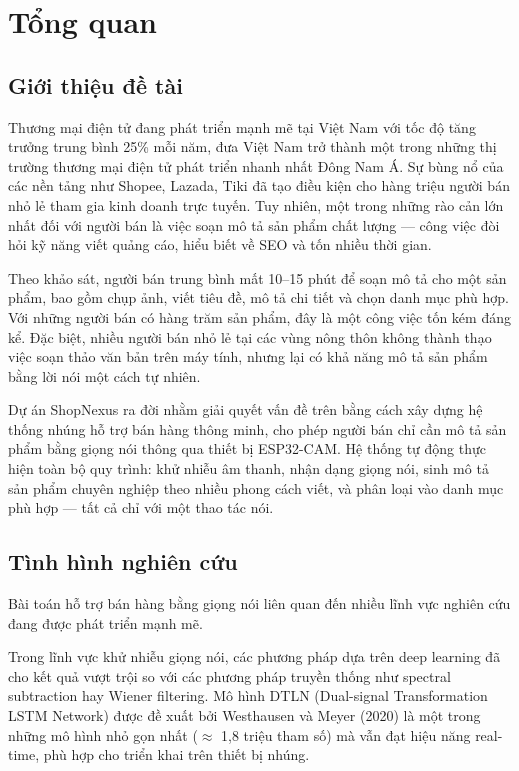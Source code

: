 \chapter{Tổng quan}

\section{Giới thiệu đề tài}

Thương mại điện tử đang phát triển mạnh mẽ tại Việt Nam với tốc độ tăng trưởng
trung bình 25\% mỗi năm, đưa Việt Nam trở thành một trong những thị trường
thương mại điện tử phát triển nhanh nhất Đông Nam Á. Sự bùng nổ của các nền
tảng như Shopee, Lazada, Tiki đã tạo điều kiện cho hàng triệu người bán nhỏ lẻ
tham gia kinh doanh trực tuyến. Tuy nhiên, một trong những rào cản lớn nhất đối
với người bán là việc soạn mô tả sản phẩm chất lượng --- công việc đòi hỏi
kỹ năng viết quảng cáo, hiểu biết về SEO và tốn nhiều thời gian.

Theo khảo sát, người bán trung bình mất 10--15 phút để soạn mô tả cho một sản
phẩm, bao gồm chụp ảnh, viết tiêu đề, mô tả chi tiết và chọn danh mục phù hợp.
Với những người bán có hàng trăm sản phẩm, đây là một công việc tốn kém đáng kể.
Đặc biệt, nhiều người bán nhỏ lẻ tại các vùng nông thôn không thành thạo việc
soạn thảo văn bản trên máy tính, nhưng lại có khả năng mô tả sản phẩm bằng
lời nói một cách tự nhiên.

Dự án ShopNexus ra đời nhằm giải quyết vấn đề trên bằng cách xây dựng hệ thống
nhúng hỗ trợ bán hàng thông minh, cho phép người bán chỉ cần mô tả sản phẩm
bằng giọng nói thông qua thiết bị ESP32-CAM. Hệ thống tự động thực hiện toàn
bộ quy trình: khử nhiễu âm thanh, nhận dạng giọng nói, sinh mô tả sản phẩm
chuyên nghiệp theo nhiều phong cách viết, và phân loại vào danh mục phù hợp
--- tất cả chỉ với một thao tác nói.

\section{Tình hình nghiên cứu}

Bài toán hỗ trợ bán hàng bằng giọng nói liên quan đến nhiều lĩnh vực
nghiên cứu đang được phát triển mạnh mẽ.

Trong lĩnh vực khử nhiễu giọng nói, các phương pháp dựa trên deep learning
đã cho kết quả vượt trội so với các phương pháp truyền thống như spectral
subtraction hay Wiener filtering. Mô hình DTLN (Dual-signal Transformation
LSTM Network) được đề xuất bởi Westhausen và Meyer (2020) là một trong những
mô hình nhỏ gọn nhất ($\approx$ 1,8 triệu tham số) mà vẫn đạt hiệu năng
real-time, phù hợp cho triển khai trên thiết bị nhúng.

